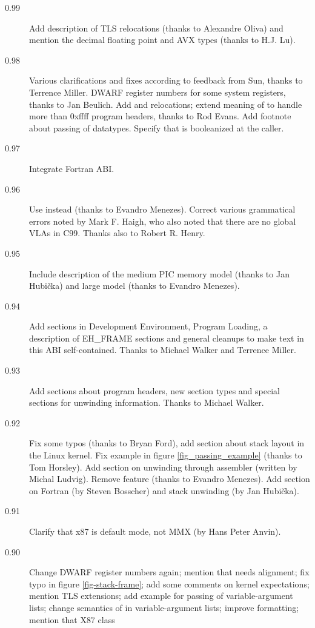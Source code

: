 \documentclass[12pt]{report}
\begin{document}
{\begin{description}
\item[0.99] Add description of TLS relocations (thanks to Alexandre
  Oliva) and mention the decimal floating point and AVX types (thanks to
  H.J. Lu).
\item[0.98] Various clarifications and fixes according to feedback
  from Sun, thanks to Terrence Miller.  DWARF register numbers for some
  system registers, thanks to Jan Beulich.  Add  and
   relocations; extend meaning of 
  to handle more than 0xffff program headers, thanks to Rod Evans.
  Add footnote about passing of  datatypes. 
  Specify that  is booleanized at the caller.
\item[0.97] Integrate Fortran ABI.
\item[0.96] Use  instead 
  (thanks to Evandro Menezes).  Correct various grammatical errors
  noted by Mark F. Haigh, who also noted that there are no global VLAs
  in C99.  Thanks also to Robert R. Henry.
\item[0.95] Include description of the medium PIC memory model (thanks
  to Jan Hubi\v{c}ka) and large model (thanks to Evandro Menezes).
\item[0.94] Add sections in Development Environment, Program Loading,
  a description of EH_FRAME sections and general cleanups to make
  text in this ABI self-contained.  Thanks to Michael Walker and Terrence
  Miller.
\item[0.93] Add sections about program headers, new section types and
  special sections for unwinding information.  Thanks to Michael
  Walker.
\item[0.92] Fix some typos (thanks to Bryan Ford), add section about
  stack layout in the Linux kernel.  Fix example in figure
  \ref{fig_passing_example} (thanks to Tom Horsley).  Add section on
  unwinding through assembler (written by Michal Ludvig).  Remove
   feature (thanks to Evandro Menezes).  Add section on
  Fortran (by Steven Bosscher) and stack unwinding (by Jan
  Hubi\v{c}ka).
\item[0.91] Clarify that x87 is default mode, not MMX (by Hans Peter
  Anvin).
\item[0.90]
  Change DWARF register
  numbers again; mention that  needs alignment; fix typo
  in figure \ref{fig-stack-frame}; add some comments on kernel
  expectations; mention TLS extensions; add example for passing of
  variable-argument lists; change semantics of \RAX in
  variable-argument lists; improve formatting; mention that X87 class

\end{description}}
\end{document}
